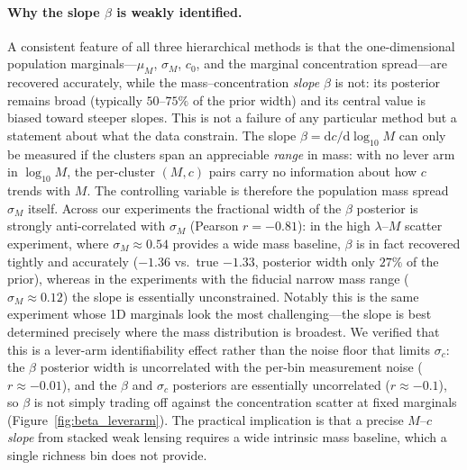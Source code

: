 
\paragraph{Why the slope $\beta$ is weakly identified.} A consistent feature of all three
hierarchical methods is that the one-dimensional population marginals---$\mu_M$, $\sigma_M$, $c_0$,
and the marginal concentration spread---are recovered accurately, while the mass--concentration
\emph{slope} $\beta$ is not: its posterior remains broad (typically $50$--$75\%$ of the prior width)
and its central value is biased toward steeper slopes. This is not a failure of any particular
method but a statement about what the data constrain. The slope $\beta = \mathrm{d}c/\mathrm{d}\log_{10}M$
can only be measured if the clusters span an appreciable \emph{range} in mass: with no lever arm in
$\log_{10}M$, the per-cluster $(M,c)$ pairs carry no information about how $c$ trends with $M$. The
controlling variable is therefore the population mass spread $\sigma_M$ itself. Across our
experiments the fractional width of the $\beta$ posterior is strongly anti-correlated with $\sigma_M$
(Pearson $r=-0.81$): in the high $\lambda$--$M$ scatter experiment, where $\sigma_M\approx0.54$
provides a wide mass baseline, $\beta$ is in fact recovered tightly and accurately
($-1.36$ vs.\ true $-1.33$, posterior width only $27\%$ of the prior), whereas in the experiments
with the fiducial narrow mass range ($\sigma_M\approx0.12$) the slope is essentially unconstrained.
Notably this is the same experiment whose 1D marginals look the most challenging---the slope is best
determined precisely where the mass distribution is broadest. We verified that this is a lever-arm
identifiability effect rather than the noise floor that limits $\sigma_c$: the $\beta$ posterior
width is uncorrelated with the per-bin measurement noise ($r\approx-0.01$), and the $\beta$ and
$\sigma_c$ posteriors are essentially uncorrelated ($r\approx-0.1$), so $\beta$ is not simply trading
off against the concentration scatter at fixed marginals (Figure~\ref{fig:beta_leverarm}). The
practical implication is that a precise $M$--$c$ \emph{slope} from stacked weak lensing requires a
wide intrinsic mass baseline, which a single richness bin does not provide.

